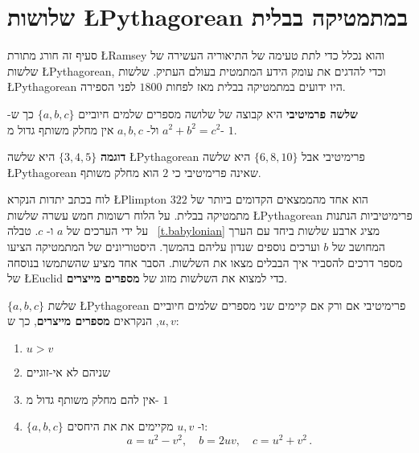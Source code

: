 
\section{שלושות \L{\normalsize Pythagorean} במתמטיקה בבלית}\label{s.plimpton}

סעיף זה חורג מתורת
\L{Ramsey}
והוא נכלל כדי לתת טעימה של התיאוריה העשירה של שלשות
\L{Pythagorean},
וכדי להדגים את עומק הידע המתמטית בעולם העתיק. שלשות
\L{Pythagorean}
היו ידועים במתמטיקה בבלית
מאז לפחות 
$1800$
לפני הספירה.
\begin{definition}
\textbf{שלשה פרמיטיבי}
היא קבוצה של שלושה מספרים שלמים חיוביים
$\{a,b,c\}$ 
כך ש-%
$a^2+b^2=c^2$
ול-%
$a,b,c$
אין מחלק משותף גדול מ-%
$1$.
\end{definition}
\textbf{דוגמה}
$\{3,4,5\}$
היא שלשה
\L{Pythagorean}
פרימיטיבי אבל 
$\{6,8,10\}$
היא שלשה
\L{Pythagorean}
שאינה פרימיטיבי כי
$2$
הוא מחלק משותף.

לוח בכתב יתדות הנקרא 
\L{Plimpton $322$}
הוא אחד מהממצאים הקדומים ביותר של מתמטיקה בבלית. על הלוח רשומות חמש עשרה שלשות 
\L{Pythagorean}
פרימיטיביות הנתנות על ידי הערכים של
$a$
ו-%
$c$.
טבלה%
~\ref{t.babylonian}
מציג ארבע שלשות ביחד עם הערך המחושב של 
$b$
וערכים נוספים שנדון עליהם בהמשך. היסטוריונים של המתמטיקה הציעו מספר דרכים להסביר איך הבבלים מצאו את השלשות. הסבר אחד מציע שהשתמשו בנוסחה של
\L{Euclid}
כדי למצוא את השלשות מזוג של
\textbf{מספרים מייצרים}.
\begin{theorem}[\L{Euclid}]\label{thm.euclid-function}
$\{a,b,c\}$ 
שלשת 
\L{Pythagorean}
פרימיטיבי אם ורק אם קיימים שני מספרים שלמים חיוביים 
$u,v$,
הנקראים
\textbf{מספרים מייצרים},
כך ש:
\begin{enumerate}
\item $u>v$
\item
שניהם לא אי-זוגיים
\item
אין להם מחלק משותף גדול מ-%
$1$
\item 
$\{a,b,c\}$
ו-%
$u,v$
מקיימים את את היחסים:
\[
a=u^2-v^2,\quad b=2uv,\quad c=u^2+v^2\,.
\]
\end{enumerate}
\end{theorem}

